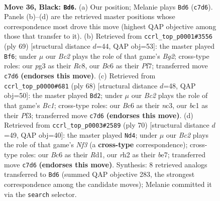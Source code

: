\documentclass[11pt]{article}
\begin{document}
\clearpage

\begin{figure}[p]\centering
\begin{subfigure}{0.46\textwidth}\centering
\resizebox{\linewidth}{!}{%
\newchessgame
\chessboard[
  setfen={2r4k/p1b3p1/P1b2n1p/1p3p2/1P3P2/4P1P1/7R/RNB3K1 b - - 2 36},
  showmover=false,
  pgfstyle=straightmove, color=movearrow, markmove={c7-d6}
]}
\caption{}
\end{subfigure}\hfill
\begin{subfigure}{0.46\textwidth}\centering
\resizebox{\linewidth}{!}{%
\newchessgame
\chessboard[
  setfen={2r3k1/5pb1/p7/3p1npP/P1p2p2/2P2P2/1P6/1KR2NR1 b - - 1 35},
  showmover=false,
  pgfstyle=straightmove, color=movearrow, markmove={g7-f6}
]}
\caption{}
\end{subfigure}
\\[4pt]
\begin{subfigure}{0.46\textwidth}\centering
\resizebox{\linewidth}{!}{%
\newchessgame
\chessboard[
  setfen={8/p2kr1b1/6pp/2P1pp2/2B4P/P1n2PP1/6K1/2B1R3 w - - 1 35},
  showmover=false,
  pgfstyle=straightmove, color=movearrow, markmove={c1-d2}
]}
\caption{}
\end{subfigure}\hfill
\begin{subfigure}{0.46\textwidth}\centering
\resizebox{\linewidth}{!}{%
\newchessgame
\chessboard[
  setfen={2k5/2p1bn1r/1p2p3/5p2/1P3P1p/5N1P/1P3BP1/3R1K2 w - - 1 36},
  showmover=false,
  pgfstyle=straightmove, color=movearrow, markmove={f3-d4}
]}
\caption{}
\end{subfigure}
\caption{\textbf{Move 36, Black: \texttt{Bd6}.} (a) Our position; Melanie plays \texttt{Bd6} (\texttt{c7d6}). Panels (b)--(d) are the retrieved master positions whose correspondence most drove this move (highest QAP objective among those that transfer to it). (b) Retrieved from \texttt{ccrl\_top\_p0001\#3556} (ply 69) [structural distance $d$=44, QAP obj=53]: the master played \texttt{Bf6}; under $\mu$ our \emph{Bc2} plays the role of that game's \emph{Bg2}; cross-type roles: our \emph{p}g3 as their \emph{R}c8, our \emph{B}c6 as their \emph{P}f7; transferred move \texttt{c7d6} \textbf{(endorses this move)}. (c) Retrieved from \texttt{ccrl\_top\_p0000\#681} (ply 68) [structural distance $d$=48, QAP obj=50]: the master played \texttt{Bd2}; under $\mu$ our \emph{Bc2} plays the role of that game's \emph{Bc1}; cross-type roles: our \emph{B}c6 as their \emph{n}c3, our \emph{b}c1 as their \emph{P}f3; transferred move \texttt{c7d6} \textbf{(endorses this move)}. (d) Retrieved from \texttt{ccrl\_top\_p0003\#2589} (ply 70) [structural distance $d$=49, QAP obj=40]: the master played \texttt{Nd4}; under $\mu$ our \emph{Bc2} plays the role of that game's \emph{Nf3} (a \textbf{cross-type} correspondence); cross-type roles: our \emph{B}c6 as their \emph{R}d1, our \emph{r}h2 as their \emph{b}e7; transferred move \texttt{c7d6} \textbf{(endorses this move)}. Synthesis: 8 retrieved analogs transferred to \texttt{Bd6} (summed QAP objective 283, the strongest correspondence among the candidate moves); Melanie committed it via the \texttt{search} selector.}
\label{fig:thought-m71}
\end{figure}
\end{document}
